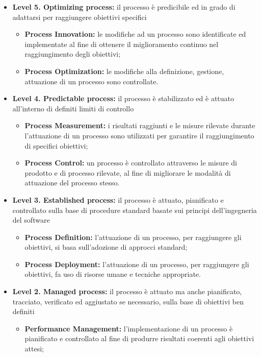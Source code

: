 		\begin{itemize}
			\item \textbf{Level 5. Optimizing process:} il processo è predicibile ed in grado di adattarsi per raggiungere
obiettivi specifici
				\begin{itemize}
					\item \textbf{Process Innovation:} le modifiche ad un processo sono identificate ed implementate al fine di ottenere il miglioramento continuo nel raggiungimento degli obiettivi;
					\item \textbf{Process Optimization:} le modifiche alla definizione, gestione, attuazione di un processo sono controllate.
				\end{itemize}
			\item \textbf{Level 4. Predictable process:} il processo è stabilizzato ed è attuato all'interno di definiti limiti di controllo
				\begin{itemize}
					\item \textbf{Process Measurement:} i risultati raggiunti e le misure rilevate durante l'attuazione di un processo sono utilizzati per garantire il raggiungimento di specifici obiettivi;
					\item \textbf{Process Control:} un processo è controllato attraverso le misure di prodotto e di processo rilevate, al fine di migliorare le modalità di attuazione del processo stesso.
				\end{itemize}
			\item \textbf{Level 3. Established process:} il processo è attuato, pianificato e controllato sulla base di procedure standard basate sui principi dell'ingegneria del software
				\begin{itemize}
					\item \textbf{Process Definition:} l'attuazione di un processo, per raggiungere gli obiettivi, si basa sull'adozione di approcci standard;
					\item \textbf{Process Deployment:} l'attuazione di un processo, per raggiungere gli obiettivi, fa uso di risorse umane e tecniche appropriate.
				\end{itemize}
			\item \textbf{Level 2. Managed process:} il processo è attuato ma anche pianificato, tracciato, verificato ed aggiustato se necessario, sulla base di obiettivi ben definiti
				\begin{itemize}
					\item \textbf{Performance Management:} l'implementazione di un processo è pianificato e controllato al fine di produrre risultati coerenti agli obiettivi attesi;

\end{itemize}
\end{itemize}
